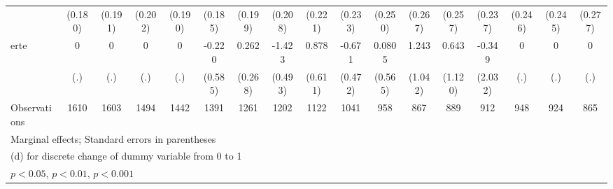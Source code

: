 {\begin{tabular}{l*{16}{c}}
                    &     (0.180)         &     (0.191)         &     (0.202)         &     (0.190)         &     (0.185)         &     (0.199)         &     (0.208)         &     (0.221)         &     (0.233)         &     (0.250)         &     (0.267)         &     (0.257)         &     (0.237)         &     (0.246)         &     (0.245)         &     (0.277)         \\
[1em]
erte                &           0         &           0         &           0         &           0         &      -0.220         &       0.262         &      -1.423\sym{**} &       0.878         &      -0.671         &      0.0805         &       1.243         &       0.643         &      -0.349         &           0         &           0         &           0         \\
                    &         (.)         &         (.)         &         (.)         &         (.)         &     (0.585)         &     (0.268)         &     (0.493)         &     (0.611)         &     (0.472)         &     (0.565)         &     (1.042)         &     (1.120)         &     (2.032)         &         (.)         &         (.)         &         (.)         \\
\hline
Observations        &        1610         &        1603         &        1494         &        1442         &        1391         &        1261         &        1202         &        1122         &        1041         &         958         &         867         &         889         &         912         &         948         &         924         &         865         \\
\hline\hline
\multicolumn{17}{l}{\footnotesize Marginal effects; Standard errors in parentheses}\\
\multicolumn{17}{l}{\footnotesize  (d) for discrete change of dummy variable from 0 to 1}\\
\multicolumn{17}{l}{\footnotesize \sym{*} \(p<0.05\), \sym{**} \(p<0.01\), \sym{***} \(p<0.001\)}\\
\end{tabular}
}
